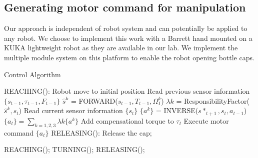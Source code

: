 

\subsection{Generating motor command for manipulation}
\label{sec:command}
Our approach is independent of robot system and can potentially be applied to any robot. We choose to implement this work with a Barrett hand mounted on a KUKA lightweight robot as they are available in our lab. We implement the multiple module system on this platform to enable the robot opening bottle caps.

\begin{algorithm}
  \caption{Control Algorithm}
  \begin{algorithmic}[1]
    \State REACHING(): Robot move to initial position\;
          \State Read previous sensor information $\{s_{t-1},\tau_{t-1},F_{t-1}\}$\;
            \State $\hat{s}^{k}$ = FORWARD($s_{t-1},T_{t-1},\Omega_I^k$) \;
          \EndFor
            \State $\lambda{k}$ = ResponsibilityFactor($\hat{s}^{k},s_t$) \;
          \EndFor
          \State Read current sensor information $\{s_{t}\}$\;
            \State $\{a^k\}$ = INVERSE($s*_{t+1},s_t,a_{t-1}$) \;
          \EndFor
          \State $\{a_t\} = \sum_{k=1,2,3}\lambda{k}\{a^k\}$\;\;
          \State Add compensational torque to $\tau_t$\;
          \State Execute motor command $\{a_t\}$ \;
          \State RELEASING(): Release the cap;
        \EndFunction
    \EndFor

        \State REACHING();
        \State TURNING();
        \State RELEASING();
    \EndWhile

  \end{algorithmic}
  \label{code:control}
\end{algorithm}



